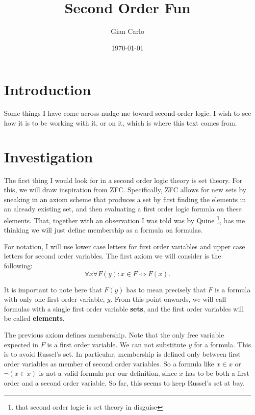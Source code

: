 \documentclass[11pt]{article}
\title{Second Order Fun}
\author{Gian Carlo}
\date{\today}
\theoremstyle{plain}
\theoremstyle{nonumberplain}
\begin{document}
\maketitle

\section{Introduction}

Some things I have come across nudge me toward second order logic. I wish to see how it is to be working with it, or on it, which is where this text comes from.

\section{Investigation}

The first thing I would look for in a second order logic theory is set theory. For this, we will draw inspiration from ZFC. Specifically, ZFC allows for new sets by sneaking in an axiom scheme that produces a set by first finding the elements in an already existing set, and then evaluating a first order logic formula on these elements. That, together with an observation I was told was by Quine \footnote{that second order logic is set theory in disguise}, has me thinking we will just define membership as a formula on formulas. 

For notation, I will use lower case letters for first order variables and upper case letters for second order variables. The first axiom we will consider is the following: \begin{equation}
    \forall x \forall F(y) : x \in F \iff F(x).
\end{equation}

It is important to note here that $F(y)$ has to mean precisely that $F$ is a formula with only one first-order variable, $y$. From this point onwards, we will call formulas with a single first order variable \textbf{sets}, and the first order variables will be called \textbf{elements}.

The previous axiom defines membership. Note that the only free variable expected in $F$ is a first order variable. We can not substitute $y$ for a formula. This is to avoid Russel's set. In particular, membership is defined only between first order variables as member of second order variables. So a formula like $x \in x$ or $\neg (x \in x)$ is not a valid formula per our definition, since $x$ has to be both a first order and a second order variable. So far, this seems to keep Russel's set at bay.
\end{document}
